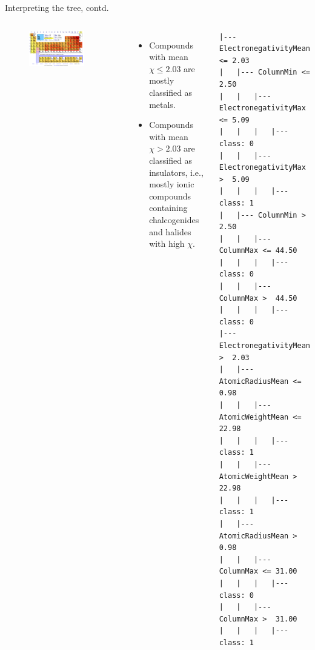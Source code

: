 \documentclass[aspectratio=169]{beamer}
\begin{document}
\begin{frame}[fragile]{Interpreting the tree, contd.}
\begin{columns}
\begin{figure}
    \centering
    \includegraphics[width=0.8\textwidth]{figures/pt_electronegativity.pdf}
\end{figure}
\scriptsize{
\begin{itemize}
    \item Compounds with mean $\chi \leq 2.03$ are mostly classified as metals. 
    \item Compounds with mean $\chi > 2.03$ are classified as insulators, i.e., mostly ionic compounds containing chalcogenides and halides with high $\chi$.
\end{itemize}}
\begin{tiny}
\begin{verbatim}
|--- ElectronegativityMean <= 2.03
|   |--- ColumnMin <= 2.50
|   |   |--- ElectronegativityMax <= 5.09
|   |   |   |--- class: 0
|   |   |--- ElectronegativityMax >  5.09
|   |   |   |--- class: 1
|   |--- ColumnMin >  2.50
|   |   |--- ColumnMax <= 44.50
|   |   |   |--- class: 0
|   |   |--- ColumnMax >  44.50
|   |   |   |--- class: 0
|--- ElectronegativityMean >  2.03
|   |--- AtomicRadiusMean <= 0.98
|   |   |--- AtomicWeightMean <= 22.98
|   |   |   |--- class: 1
|   |   |--- AtomicWeightMean >  22.98
|   |   |   |--- class: 1
|   |--- AtomicRadiusMean >  0.98
|   |   |--- ColumnMax <= 31.00
|   |   |   |--- class: 0
|   |   |--- ColumnMax >  31.00
|   |   |   |--- class: 1
\end{verbatim}
\end{tiny}
\end{columns}
\end{frame}
\end{document}

